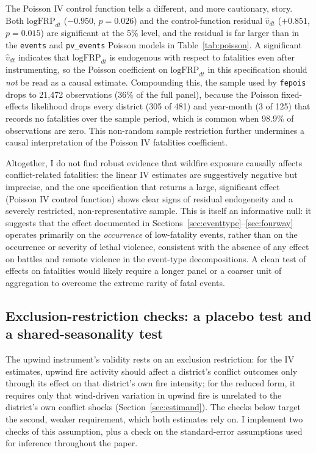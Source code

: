 \documentclass[12pt]{article}
\begin{document}
The Poisson IV control function tells a different, and more cautionary, story. Both $\text{logFRP}_{dt}$ ($-0.950$, $p=0.026$) and the control-function residual $\hat{v}_{dt}$ ($+0.851$, $p=0.015$) are significant at the 5\% level, and the residual is far larger than in the \texttt{events} and \texttt{pv\_events} Poisson models in Table~\ref{tab:poisson}. A significant $\hat{v}_{dt}$ indicates that $\text{logFRP}_{dt}$ is endogenous with respect to fatalities even after instrumenting, so the Poisson coefficient on $\text{logFRP}_{dt}$ in this specification should \emph{not} be read as a causal estimate. Compounding this, the sample used by \texttt{fepois} drops to 21{,}472 observations (36\% of the full panel), because the Poisson fixed-effects likelihood drops every district (305 of 481) and year-month (3 of 125) that records no fatalities over the sample period, which is common when 98.9\% of observations are zero. This non-random sample restriction further undermines a causal interpretation of the Poisson IV fatalities coefficient.

Altogether, I do not find robust evidence that wildfire exposure causally affects conflict-related fatalities: the linear IV estimates are suggestively negative but imprecise, and the one specification that returns a large, significant effect (Poisson IV control function) shows clear signs of residual endogeneity and a severely restricted, non-representative sample. This is itself an informative null: it suggests that the effect documented in Sections~\ref{sec:eventtype}--\ref{sec:fourway} operates primarily on the \emph{occurrence} of low-fatality events, rather than on the occurrence or severity of lethal violence, consistent with the absence of any effect on battles and remote violence in the event-type decompositions. A clean test of effects on fatalities would likely require a longer panel or a coarser unit of aggregation to overcome the extreme rarity of fatal events.

\subsection{Exclusion-restriction checks: a placebo test and a shared-seasonality test}
\label{sec:robustness}

The upwind instrument's validity rests on an exclusion restriction: for the IV estimates, upwind fire activity should affect a district's conflict outcomes only through its effect on that district's own fire intensity; for the reduced form, it requires only that wind-driven variation in upwind fire is unrelated to the district's own conflict shocks (Section~\ref{sec:estimand}). The checks below target the second, weaker requirement, which both estimates rely on. I implement two checks of this assumption, plus a check on the standard-error assumptions used for inference throughout the paper.
\end{document}
